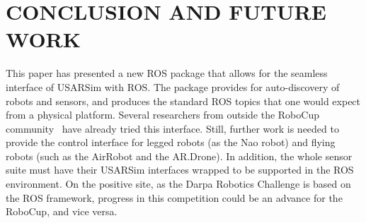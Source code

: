 \section*{CONCLUSION AND FUTURE WORK}\label{s:conclusion}
This paper has presented a new ROS package that allows for the seamless interface of USARSim with ROS. 
The package provides for auto-discovery of robots and sensors, and produces the standard ROS topics that one would expect from a physical platform. 
Several researchers from outside the RoboCup community~\cite{haberjmesim,meyer2012comprehensive} have already tried this interface. %
Still, further work is needed to provide the control interface for legged robots (as the Nao robot) and flying robots (such as the AirRobot and the AR.Drone).
In addition, the whole sensor suite must have their USARSim interfaces wrapped to be supported in the ROS environment.
On the positive site, as the Darpa Robotics Challenge is based on the ROS framework, progress in this competition could be an advance for the RoboCup, and vice versa.